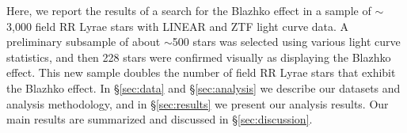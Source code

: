 Here, we report the results of a search for the Blazhko effect in a sample of $\sim$3,000 field RR Lyrae stars with
LINEAR and ZTF light curve data. A preliminary subsample of about $\sim$500 stars was selected using various
light curve statistics, and then 228 stars were confirmed visually as displaying the Blazhko effect. This new
sample doubles the number of field RR Lyrae stars that exhibit the Blazhko effect. In \S\ref{sec:data}
and \S\ref{sec:analysis} we describe our datasets and analysis methodology, and in \S\ref{sec:results} we present our analysis results. 
Our main results are summarized and discussed in \S\ref{sec:discussion}.
